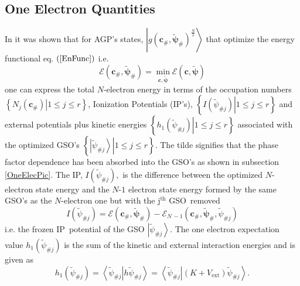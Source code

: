 \documentclass[aps,preprint]{revtex4}%
\begin{document}
\subsection{One Electron Quantities\label{OEP}}

In \cite{OrtizWeiner2006} it was shown that for AGP's states, $\left\vert
g\left(  \boldsymbol{c}_{\#},\boldsymbol{\tilde{\psi}}_{\#}\right)  ^{\frac
{N}{2}}\right\rangle $ that optimize the energy functional eq. $\left(
\ref{EnFunc}\right)  $ i.e.
\begin{equation}
\mathcal{E}\left(  \boldsymbol{c}_{\#},\boldsymbol{\tilde{\psi}}_{\#}\right)
=\min_{\boldsymbol{c},\boldsymbol{\tilde{\psi}}}\mathcal{E}\left(
\boldsymbol{c},\boldsymbol{\tilde{\psi}}\right)
\end{equation}
one can express the total $N$-electron energy in terms of the occupation
numbers $\left\{  \left.  N_{j}\left(  \boldsymbol{c}_{\#}\right)  \right\vert
1\leq j\leq r\right\}  $, Ionization Potentials (IP's), $\left\{  \left.
I\left(  \tilde{\psi}_{\#j}\right)  \right\vert 1\leq j\leq r\right\}  $ and
external potentials plus kinetic energies $\left\{  \left.  h_{1}\left(
\tilde{\psi}_{\#j}\right)  \right\vert 1\leq j\leq r\right\}  $ associated
with the optimized GSO's $\left\{  \left.  \left\vert \tilde{\psi}%
_{\#j}\right\rangle \right\vert 1\leq j\leq r\right\}  $. The tilde signifies
that the phase factor dependence has been absorbed into the GSO's as shown in
subsection \ref{OneElecPic}. The IP, $I\left(  \tilde{\psi}_{\#j}\right)  ,$
is the difference between the optimized $N$-electron state energy and the
$N$-$1$ electron state energy formed by the same GSO's as the $N$-electron one
but with the j$^{\text{th}}$ GSO\ removed
\begin{equation}
I\left(  \tilde{\psi}_{\#j}\right)  =\mathcal{E}\left(  \boldsymbol{c}%
_{\#},\boldsymbol{\tilde{\psi}}_{\#}\right)  -\mathcal{E}_{N\,-1}\left(
\boldsymbol{c}_{\#},\boldsymbol{\tilde{\psi}}_{\#},\tilde{\psi}_{\#j}\right)
\end{equation}
i.e. the frozen IP\ potential of the GSO $\left\vert \tilde{\psi}%
_{\#j}\right\rangle $. The one electron expectation value $h_{1}\left(
\tilde{\psi}_{\#j}\right)  $ is the sum of the kinetic and external
interaction energies and is given as
\begin{equation}
h_{1}\left(  \tilde{\psi}_{\#j}\right)  =\left\langle \left.  \tilde{\psi
}_{\#j}\right\vert h\tilde{\psi}_{\#j}\right\rangle =\left\langle \left.
\tilde{\psi}_{\#j}\right\vert \left(  K+V_{\text{ext}}\right)  \tilde{\psi
}_{\#j}\right\rangle .
\end{equation}
\end{document}
